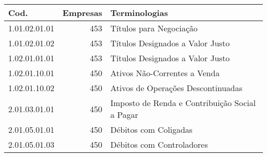 \begin{table}[ht]
\centering
\begin{tabular}{lrl}
  \hline
Cod. & Empresas & Terminologias \\ 
  \hline
1.01.02.01.01 & 453 & Títulos para Negociação \\ 
  1.01.02.01.02 & 453 & Títulos Designados a Valor Justo \\ 
  1.02.01.01.01 & 453 & Títulos Designados a Valor Justo \\ 
  1.02.01.10.01 & 450 & Ativos Não-Correntes a Venda \\ 
  1.02.01.10.02 & 450 & Ativos de Operações Descontinuadas \\ 
  2.01.03.01.01 & 450 & Imposto de Renda e Contribuição Social a Pagar \\ 
  2.01.05.01.01 & 450 & Débitos com Coligadas \\ 
  2.01.05.01.03 & 450 & Débitos com Controladores \\ 
   \hline
\end{tabular}
\end{table}
